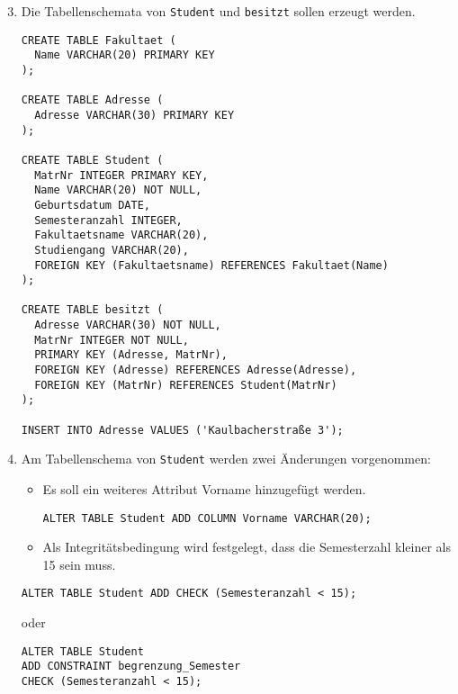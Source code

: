 \documentclass{bschlangaul-aufgabe}
\begin{document}
\begin{enumerate}
\setcounter{enumi}{2}

\item Die Tabellenschemata von \texttt{Student} und \texttt{besitzt}
sollen erzeugt werden.

\begin{bAntwort}
\begin{verbatim}
CREATE TABLE Fakultaet (
  Name VARCHAR(20) PRIMARY KEY
);

CREATE TABLE Adresse (
  Adresse VARCHAR(30) PRIMARY KEY
);

CREATE TABLE Student (
  MatrNr INTEGER PRIMARY KEY,
  Name VARCHAR(20) NOT NULL,
  Geburtsdatum DATE,
  Semesteranzahl INTEGER,
  Fakultaetsname VARCHAR(20),
  Studiengang VARCHAR(20),
  FOREIGN KEY (Fakultaetsname) REFERENCES Fakultaet(Name)
);

CREATE TABLE besitzt (
  Adresse VARCHAR(30) NOT NULL,
  MatrNr INTEGER NOT NULL,
  PRIMARY KEY (Adresse, MatrNr),
  FOREIGN KEY (Adresse) REFERENCES Adresse(Adresse),
  FOREIGN KEY (MatrNr) REFERENCES Student(MatrNr)
);

INSERT INTO Adresse VALUES ('Kaulbacherstraße 3');

\end{verbatim}
\end{bAntwort}

\item Am Tabellenschema von \texttt{Student} werden zwei Änderungen
vorgenommen:

\begin{itemize}
\item Es soll ein weiteres Attribut Vorname hinzugefügt werden.

\begin{bAntwort}
\begin{verbatim}
ALTER TABLE Student ADD COLUMN Vorname VARCHAR(20);
\end{verbatim}
\end{bAntwort}

\item Als Integritätsbedingung wird festgelegt, dass die Semesterzahl
kleiner als 15 sein muss.
\end{itemize}

\begin{bAntwort}
\begin{verbatim}
ALTER TABLE Student ADD CHECK (Semesteranzahl < 15);
\end{verbatim}

oder

\begin{verbatim}
ALTER TABLE Student
ADD CONSTRAINT begrenzung_Semester
CHECK (Semesteranzahl < 15);
\end{verbatim}
\end{bAntwort}

\end{enumerate}
\end{document}
